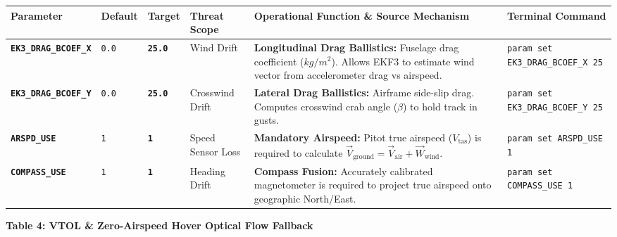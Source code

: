 \documentclass[10pt,letterpaper]{article}
\begin{document}
\noindent
\footnotesize
\renewcommand{\arraystretch}{1.2}
\begin{tabularx}{\textwidth}{L{0.18\textwidth} C{0.07\textwidth} C{0.08\textwidth} L{0.14\textwidth} Y L{0.25\textwidth}}
\toprule
{}
\textbf{Parameter} & \textbf{Default} & \textbf{Target} & \textbf{Threat Scope} & \textbf{Operational Function \& Source Mechanism} & \textbf{Terminal Command} \\
\midrule
\texttt{\bfseries EK3\_DRAG\_BCOEF\_X} & \texttt{0.0} & \texttt{\bfseries 25.0} & Wind Drift & 
\textbf{Longitudinal Drag Ballistics:} Fuselage drag coefficient ($kg/m^2$). Allows EKF3 to estimate wind vector from accelerometer drag vs airspeed. & 
\texttt{\scriptsize\color{cmdgreen}param set EK3\_DRAG\_BCOEF\_X 25} \\
\texttt{\bfseries EK3\_DRAG\_BCOEF\_Y} & \texttt{0.0} & \texttt{\bfseries 25.0} & Crosswind Drift & 
\textbf{Lateral Drag Ballistics:} Airframe side-slip drag. Computes crosswind crab angle ($\beta$) to hold track in gusts. & 
\texttt{\scriptsize\color{cmdgreen}param set EK3\_DRAG\_BCOEF\_Y 25} \\
\texttt{\bfseries ARSPD\_USE} & \texttt{1} & \texttt{\bfseries 1} & Speed Sensor Loss & 
\textbf{Mandatory Airspeed:} Pitot true airspeed ($V_{\text{tas}}$) is required to calculate $\vec{V}_{\text{ground}} = \vec{V}_{\text{air}} + \vec{W}_{\text{wind}}$. & 
\texttt{\scriptsize\color{cmdgreen}param set ARSPD\_USE 1} \\
\texttt{\bfseries COMPASS\_USE} & \texttt{1} & \texttt{\bfseries 1} & Heading Drift & 
\textbf{Compass Fusion:} Accurately calibrated magnetometer is required to project true airspeed onto geographic North/East. & 
\texttt{\scriptsize\color{cmdgreen}param set COMPASS\_USE 1} \\
\bottomrule
\end{tabularx}

\vspace{3.5mm}
\noindent\textbf{\normalsize Table 4: VTOL \& Zero-Airspeed Hover Optical Flow Fallback}
\vspace{0.8mm}
\end{document}
